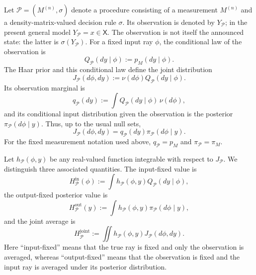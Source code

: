\documentclass[journal]{IEEEtran}
\begin{document}
Let \(\mathcal P=(M^{(n)},\sigma)\) denote a procedure consisting of a
measurement \(M^{(n)}\) and a density-matrix-valued decision rule \(\sigma\).
Its observation is denoted by \(Y_{\mathcal P}\); in the present general model
\(Y_{\mathcal P}=x\in\mathsf X\).  The observation is not itself the announced
state: the latter is \(\sigma(Y_{\mathcal P})\).  For a fixed input ray \(\phi\),
the conditional law of the observation is
\begin{equation}
    Q_{\mathcal P}(dy\mid\phi)
    :=
    p_M(dy\mid\phi).
    \label{eq:procedure_conditional_output_law}
\end{equation}
The Haar prior and this conditional law define the joint distribution
\begin{equation}
    J_{\mathcal P}(d\phi,dy)
    :=
    \nu(d\phi)Q_{\mathcal P}(dy\mid\phi).
    \label{eq:procedure_joint_input_output_law}
\end{equation}
Its observation marginal is
\begin{equation}
    q_{\mathcal P}(dy)
    :=
    \int Q_{\mathcal P}(dy\mid\phi)\,\nu(d\phi),
    \label{eq:procedure_output_marginal_law}
\end{equation}
and its conditional input distribution given the observation is the posterior
\(\pi_{\mathcal P}(d\phi\mid y)\).  Thus, up to the usual null sets,
\begin{equation}
    J_{\mathcal P}(d\phi,dy)
    =
    q_{\mathcal P}(dy)\pi_{\mathcal P}(d\phi\mid y).
    \label{eq:procedure_joint_law_disintegration}
\end{equation}
For the fixed measurement notation used above,
\(q_{\mathcal P}=p_M\) and \(\pi_{\mathcal P}=\pi_M\).

Let \(h_{\mathcal P}(\phi,y)\) be any real-valued function integrable with
respect to \(J_{\mathcal P}\).  We distinguish three associated quantities.
The input-fixed value is
\begin{equation}
    H_{\mathcal P}^{\mathrm{in}}(\phi)
    :=
    \int h_{\mathcal P}(\phi,y)Q_{\mathcal P}(dy\mid\phi),
    \label{eq:procedure_input_fixed_value}
\end{equation}
the output-fixed posterior value is
\begin{equation}
    H_{\mathcal P}^{\mathrm{out}}(y)
    :=
    \int h_{\mathcal P}(\phi,y)\pi_{\mathcal P}(d\phi\mid y),
    \label{eq:procedure_output_fixed_value}
\end{equation}
and the joint average is
\begin{equation}
    H_{\mathcal P}^{\mathrm{joint}}
    :=
    \iint h_{\mathcal P}(\phi,y)J_{\mathcal P}(d\phi,dy).
    \label{eq:procedure_joint_average_value}
\end{equation}
Here ``input-fixed'' means that the true ray is fixed and only the observation
is averaged, whereas ``output-fixed'' means that the observation is fixed and
the input ray is averaged under its posterior distribution.
\end{document}
